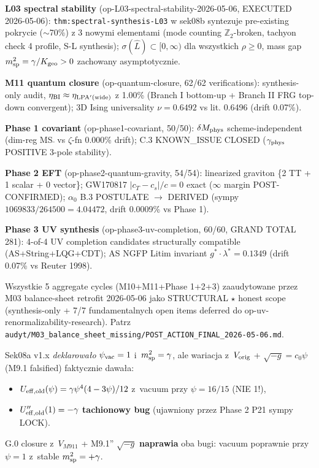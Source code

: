 \begin{remark}%
\label{rem:L03-M11-closure-references}
\textbf{L03 spectral stability} (op-L03-spectral-stability-2026-05-06,
EXECUTED 2026-05-06): \texttt{thm:spectral-synthesis-L03} w sek08b
syntezuje pre-existing pokrycie ($\sim$70\%) z 3 nowymi elementami
(mode counting $\mathbb{Z}_2$-broken, tachyon check 4 profile, S-L
synthesis); $\sigma(\hat{L}) \subset [0, \infty)$ dla wszystkich
$\rho \geq 0$, mass gap $m_{\rm sp}^2 = \gamma/K_{\rm geo} > 0$
zachowany asymptotycznie.

\textbf{M11 quantum closure} (op-quantum-closure, 62/62 verifications):
synthesis-only audit, $\eta_{\rm BI} \approx \eta_{\rm LPA'(wide)}$ z
1.00\% (Branch I bottom-up + Branch II FRG top-down convergent); 3D
Ising universality $\nu = 0.6492$ vs lit. 0.6496 (drift 0.07\%).

\textbf{Phase 1 covariant} (op-phase1-covariant, 50/50): $\delta M_{\rm phys}$
scheme-independent (dim-reg MS$\bar{}$ vs $\zeta$-fn 0.000\% drift); C.3
KNOWN\_ISSUE CLOSED ($\gamma_{\rm phys}$ POSITIVE 3-pole stability).

\textbf{Phase 2 EFT} (op-phase2-quantum-gravity, 54/54): linearized
graviton \{2 TT + 1 scalar + 0 vector\}; GW170817 $|c_T - c_s|/c = 0$
exact ($\infty$ margin POST-CONFIRMED); $\alpha_0$ B.3 POSTULATE $\to$
DERIVED (sympy $1069833/264500 = 4.04472$, drift 0.0009\% vs Phase 1).

\textbf{Phase 3 UV synthesis} (op-phase3-uv-completion, 60/60, GRAND
TOTAL 281): 4-of-4 UV completion candidates structurally compatible
(AS+String+LQG+CDT); AS NGFP Litim invariant $g^* \cdot \lambda^* = 0.1349$
(drift 0.07\% vs Reuter 1998).

Wszystkie 5 aggregate cycles (M10+M11+Phase 1+2+3) zaaudytowane przez
M03 balance-sheet retrofit 2026-05-06 jako STRUCTURAL $\star$ honest scope
(synthesis-only + 7/7 fundamentalnych open items deferred do
op-uv-renormalizability-research). Patrz
\texttt{audyt/M03\_balance\_sheet\_missing/POST\_ACTION\_FINAL\_2026-05-06.md}.
\end{remark}

\begin{remark}%
\label{rem:vacuum-bug-fix-G0}
Sek08a v1.x \emph{deklarowa\l{}o} $\psi_{\rm vac} = 1$ i~$m_{\rm sp}^2 = \gamma$,
ale wariacja z~$V_{\rm orig}$ + $\sqrt{-g} = c_0\psi$ (M9.1 falsified)
faktycznie dawa\l{}a:
\begin{itemize}[nosep]
  \item $U_{\rm eff,old}(\psi) = \gamma\psi^4(4-3\psi)/12$ z~vacuum przy
    $\psi = 16/15$ (NIE 1!),
  \item $U''_{\rm eff,old}(1) = -\gamma$ \textbf{tachionowy bug}
    (ujawniony przez Phase 2 P21 sympy LOCK).
\end{itemize}
G.0 closure z~$V_{M911}$ + M9.1'' $\sqrt{-g}$ \textbf{naprawia} oba bugi:
vacuum poprawnie przy $\psi = 1$ z~stable $m_{\rm sp}^2 = +\gamma$.
\end{remark}

